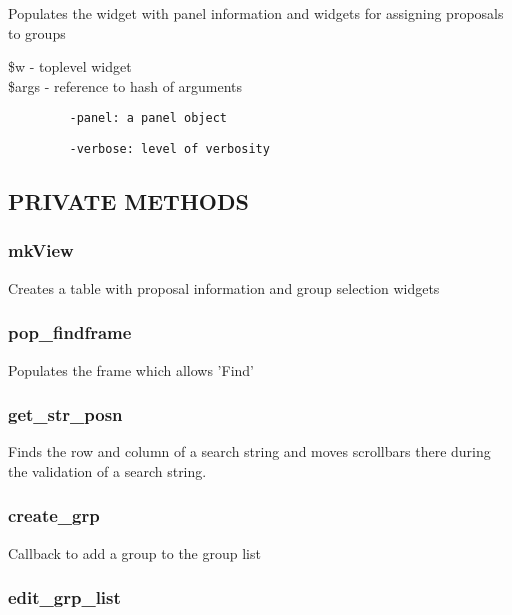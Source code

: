 \documentclass{article}
\begin{document}
Populates the widget with panel information and widgets for assigning
proposals to groups

\begin{description}

\item[{\$w - toplevel widget}] \mbox{}
\item[{\$args - reference to hash of arguments}] \mbox{}\begin{verbatim}
   -panel: a panel object
\end{verbatim}
\begin{verbatim}
   -verbose: level of verbosity
\end{verbatim}
\end{description}
\subsection*{PRIVATE METHODS\label{MkGroup_PRIVATE_METHODS}}
\subsubsection*{mkView\label{MkGroup_mkView}}


Creates a table with proposal information and group selection widgets

\subsubsection*{pop\_findframe\label{MkGroup_pop_findframe}}


Populates the frame which allows 'Find'

\subsubsection*{get\_str\_posn\label{MkGroup_get_str_posn}}


Finds the row and column of a search string and moves scrollbars there
during the validation of a search string.

\subsubsection*{create\_grp\label{MkGroup_create_grp}}


Callback to add a group to the group list

\subsubsection*{edit\_grp\_list\label{MkGroup_edit_grp_list}}
\end{document}
